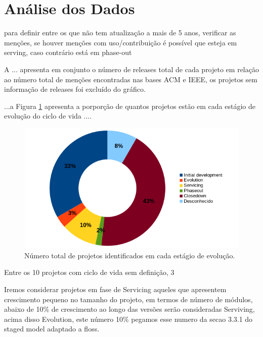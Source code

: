 
\section{Análise dos Dados} \label{estudo3:analise}

para definir entre os que não tem atualização a mais de 5 anos, verificar as
menções, se houver menções com uso/contribuição é possível que esteja em serving,
caso contrário está em phase-out

A ... apresenta em conjunto o número de releases total
de cada projeto em relação ao número total de menções encontradas nas bases ACM e IEEE,
os projetos sem informação de releases foi excluído do gráfico.


...a Figura \ref{life-cycle} apresenta a porporção de quantos projetos estão em
cada estágio de evolução do ciclo de vida ....

\begin{figure}[h]
  \begin{minipage}{0.5\textwidth}
    \centering
    \includegraphics[scale=0.55]{imagens/life-cycle-pie.png}
  \end{minipage}
  \begin{minipage}{0.5\textwidth}
    \centering
    
  \end{minipage}
  \caption{Número total de projetos identificados em cada estágio de evolução.}
  \label{life-cycle}
\end{figure}


Entre os 10 projetos com ciclo de vida sem definição, 3

Iremos considerar projetos em fase de Servicing aqueles que apresentem crescimento
pequeno no tamanho do projeto, em termos de número de módulos, abaixo de 10\% de crescimento
ao longo das versões serão consideradas Serviving, acima disso Evolution, este número 10\%
pegamos esse numero da secao 3.3.1 do staged model adaptado a floss.

